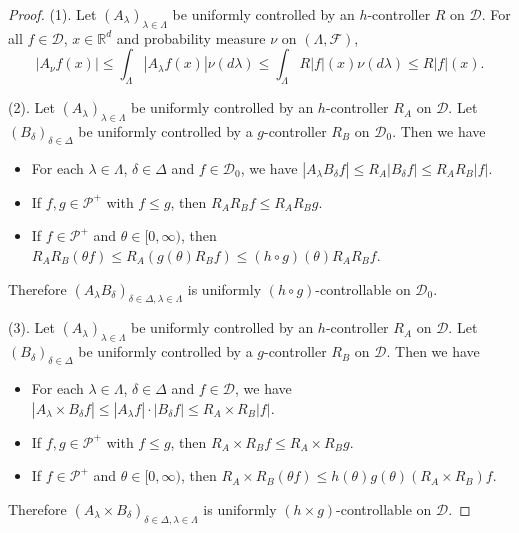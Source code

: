 \documentclass[12pt,a4paper]{amsart}
\theoremstyle{plain}
\theoremstyle{definition}
\numberwithin{equation}{section}
\begin{document}
\begin{proof}
    (1). Let $(A_\lambda)_{\lambda\in\Lambda}$ be uniformly controlled by an $h$-controller $R$ on $\mathcal D$.
    For all $f \in \mathcal{D}$, $x\in \mathbb R^d$ and  probability measure $\nu$ on $(\Lambda, \mathscr F)$,
\[
    |A_{\nu}f(x)|\leq \int_{\Lambda}|A_{\lambda}f(x)|\nu(d\lambda) \leq \int_{\Lambda}R|f|(x)\nu(d\lambda) \leq R|f|(x).
\]

    (2). Let $(A_\lambda)_{\lambda\in\Lambda}$ be uniformly controlled by  an $h$-controller $R_A$ on $\mathcal D$.
    Let $(B_\delta)_{\delta\in\Delta}$ be uniformly controlled by a $g$-controller $R_B$ on $\mathcal D_0$.
    Then we have
\begin{itemize}
\item
    For each $\lambda \in \Lambda$, $\delta \in \Delta$ and $f\in \mathcal D_0$, we have $|A_\lambda B_\delta f| \leq R_A |B_\delta f| \leq R_A R_B |f|$.
\item
        If $f,g \in \mathcal P^+$ with $f\leq g$, then $R_AR_Bf \leq R_A R_B g$.
\item
       If $f \in \mathcal P^+$ and $\theta \in [0,\infty)$, then $R_AR_B(\theta f) \leq R_A(g(\theta) R_Bf) \leq (h\circ g)(\theta) R_A R_B f $.
\end{itemize}
    Therefore $(A_\lambda B_\delta)_{\delta\in \Delta, \lambda \in \Lambda}$ is uniformly $(h \circ g)$-controllable on $\mathcal D_0$.

    (3). Let $(A_\lambda)_{\lambda\in\Lambda}$ be uniformly controlled by an $h$-controller $R_A$ on $\mathcal D$.
    Let $(B_\delta)_{\delta\in\Delta}$ be uniformly controlled by a $g$-controller $R_B$ on $\mathcal D$.
    Then we have
\begin{itemize}
\item
    For each $\lambda \in \Lambda$, $\delta \in \Delta$ and $f\in \mathcal D$, we have $|A_\lambda \times B_\delta f| \leq |A_\lambda f| \cdot |B_\delta f| \leq R_A \times R_B |f|$.
\item
       If $f,g \in \mathcal P^+$ with $f\leq g$, then $R_A\times R_Bf \leq R_A\times R_B g$.
\item
        If $f \in \mathcal P^+$ and $\theta \in [0,\infty)$, then $R_A\times R_B (\theta f) \leq h(\theta) g(\theta) (R_A \times R_B) f $.
\end{itemize}
    Therefore $(A_\lambda \times B_\delta)_{\delta\in \Delta, \lambda \in \Lambda}$ is uniformly $(h \times g)$-controllable on $\mathcal D$.


\end{proof}
\end{document}
